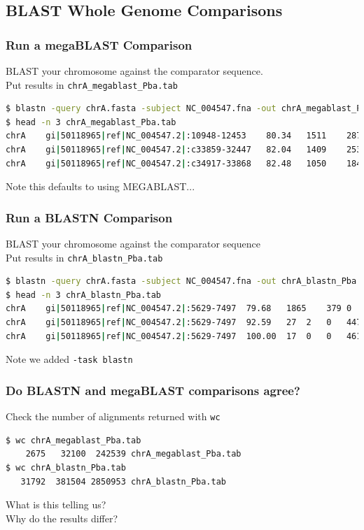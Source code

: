 %

\subsection{BLAST Whole Genome Comparisons}
\begin{frame}[fragile]
  \frametitle{Run a megaBLAST Comparison}
  BLAST your chromosome against the comparator sequence. \\
  Put results in \texttt{chrA\_megablast\_Pba.tab}
\begin{lstlisting}[language=bash]
$ blastn -query chrA.fasta -subject NC_004547.fna -out chrA_megablast_Pba.tab -outfmt 6 
$ head -n 3 chrA_megablast_Pba.tab 
chrA	gi|50118965|ref|NC_004547.2|:10948-12453	80.34	1511	287	10	4579450	4580955	1506	1	0.0	1136
chrA	gi|50118965|ref|NC_004547.2|:c33859-32447	82.04	1409	253	0	4563151	4564559	1	1409	0.0	1201
chrA	gi|50118965|ref|NC_004547.2|:c34917-33868	82.48	1050	184	0	4562093	4563142	1	1050	0.0	 920
\end{lstlisting}
Note this defaults to using MEGABLAST...
\end{frame}
    
\begin{frame}[fragile]
  \frametitle{Run a BLASTN Comparison}
  BLAST your chromosome against the comparator sequence \\
  Put results in \texttt{chrA\_blastn\_Pba.tab}
\begin{lstlisting}[language=bash]
$ blastn -query chrA.fasta -subject NC_004547.fna -out chrA_blastn_Pba.tab -outfmt 6 -task blastn
$ head -n 3 chrA_blastn_Pba.tab 
chrA	gi|50118965|ref|NC_004547.2|:5629-7497	79.68	1865	379	0	4584915	4586779	1865	1	0.0	1654
chrA	gi|50118965|ref|NC_004547.2|:5629-7497	92.59	27	2	0	4479367	4479393	1254	1280	0.004	41.0
chrA	gi|50118965|ref|NC_004547.2|:5629-7497	100.00	17	0	0	4613022	4613038	52	36	2.1	31.9
\end{lstlisting}
Note we added \texttt{-task blastn}
\end{frame}
    
\begin{frame}[fragile]
  \frametitle{Do BLASTN and megaBLAST comparisons agree?}
  Check the number of alignments returned with \texttt{wc}
\begin{lstlisting}[language=bash]
$ wc chrA_megablast_Pba.tab 
    2675   32100  242539 chrA_megablast_Pba.tab
$ wc chrA_blastn_Pba.tab
   31792  381504 2850953 chrA_blastn_Pba.tab
\end{lstlisting}
  What is this telling us? \\
  Why do the results differ?
\end{frame}

